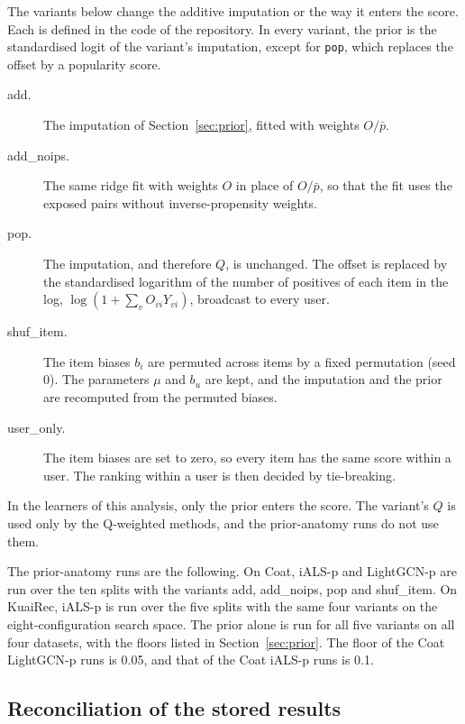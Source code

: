 The variants below change the additive imputation or the way it enters the score. Each is defined in the code of
the repository. In every variant, the prior is the standardised logit of the variant's imputation, except for
\texttt{pop}, which replaces the offset by a popularity score.
\begin{description}
\item[add.] The imputation of Section~\ref{sec:prior}, fitted with weights $O/\bar p$.
\item[add\_noips.] The same ridge fit with weights $O$ in place of $O/\bar p$, so that the fit uses the exposed
pairs without inverse-propensity weights.
\item[pop.] The imputation, and therefore $Q$, is unchanged. The offset is replaced by the standardised
logarithm of the number of positives of each item in the log, $\log(1+\sum_v O_{vi}Y_{vi})$, broadcast to every
user.
\item[shuf\_item.] The item biases $b_i$ are permuted across items by a fixed permutation (seed 0). The
parameters $\mu$ and $b_u$ are kept, and the imputation and the prior are recomputed from the permuted biases.
\item[user\_only.] The item biases are set to zero, so every item has the same score within a user. The ranking
within a user is then decided by tie-breaking.
\end{description}
In the learners of this analysis, only the prior enters the score. The variant's $Q$ is used only by the
Q-weighted methods, and the prior-anatomy runs do not use them.

The prior-anatomy runs are the following. On Coat, iALS-p and LightGCN-p are run over the ten splits with the
variants add, add\_noips, pop and shuf\_item. On KuaiRec, iALS-p is run over the five splits with the same four
variants on the eight-configuration search space. The prior alone is run for all five variants on all four datasets,
with the floors listed in Section~\ref{sec:prior}. The floor of the Coat LightGCN-p runs is 0.05, and that of the
Coat iALS-p runs is 0.1.


\subsection{Reconciliation of the stored results}\label{sec:reconcile}

